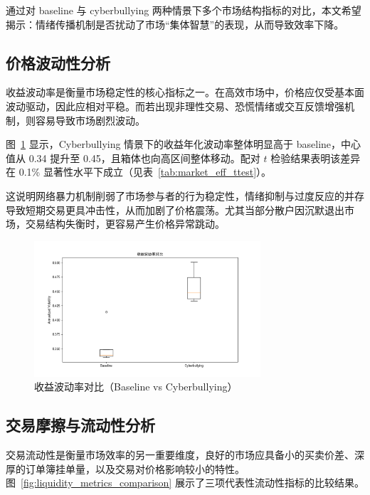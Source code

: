     通过对 baseline 与 cyberbullying 两种情景下多个市场结构指标的对比，本文希望揭示：情绪传播机制是否扰动了市场“集体智慧”的表现，从而导致效率下降。
    
    \subsection{价格波动性分析}
    
    收益波动率是衡量市场稳定性的核心指标之一。在高效市场中，价格应仅受基本面波动驱动，因此应相对平稳。而若出现非理性交易、恐慌情绪或交互反馈增强机制，则容易导致市场剧烈波动。
    
    图~\ref{fig:volatility_comparison} 显示，Cyberbullying 情景下的收益年化波动率整体明显高于 baseline，中心值从 0.34 提升至 0.45，且箱体也向高区间整体移动。配对 \(t\) 检验结果表明该差异在 0.1\% 显著性水平下成立（见表~\ref{tab:market_eff_ttest}）。
    
    这说明网络暴力机制削弱了市场参与者的行为稳定性，情绪抑制与过度反应的并存导致短期交易更具冲击性，从而加剧了价格震荡。尤其当部分散户因沉默退出市场，交易结构失衡时，更容易产生价格异常跳动。
    
    \begin{figure}[htbp]
        \centering
        \includegraphics[width=0.75\textwidth]{image/fig4_8_volatility_comparison.png}
        \caption{收益波动率对比（Baseline vs Cyberbullying）}
        \label{fig:volatility_comparison}
    \end{figure}
    
    \subsection{交易摩擦与流动性分析}
    
    交易流动性是衡量市场效率的另一重要维度，良好的市场应具备小的买卖价差、深厚的订单簿挂单量，以及交易对价格影响较小的特性。图~\ref{fig:liquidity_metrics_comparison} 展示了三项代表性流动性指标的比较结果。
    
